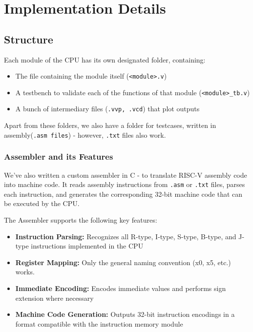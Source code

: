 \documentclass[journal]{IEEEtran}
\begin{document}
\section{Implementation Details}

\subsection{Structure}
Each module of the CPU has its own designated folder, containing:
\begin{itemize}
  \item The file containing the module itself (\texttt{<module>.v})
  \item A testbench to validate each of the functions of that module (\texttt{<module>\_tb.v})
  \item A bunch of intermediary files (\texttt{.vvp, .vcd}) that plot outputs
\end{itemize}

Apart from these folders, we also have a folder for testcases, written in
assembly(\texttt{.asm files}) - however, \texttt{.txt} files also work.

\subsubsection{Assembler and its Features}
We've also written a custom assembler in C - to translate RISC-V assembly code
into machine code. It reads assembly instructions from \texttt{.asm} or
\texttt{.txt} files, parses each instruction, and generates the corresponding
32-bit machine code that can be executed by the CPU.

The Assembler supports the following key features:

\begin{itemize}
  \item \textbf{Instruction Parsing:} Recognizes all R-type, I-type, S-type,
        B-type, and J-type instructions implemented in the CPU
  \item \textbf{Register Mapping:} Only the general naming convention (x0, x5,
        etc.) works.
  \item \textbf{Immediate Encoding:} Encodes immediate values and
        performs sign extension where necessary
  \item \textbf{Machine Code Generation:} Outputs 32-bit instruction encodings
        in a format compatible with the instruction memory module
\end{itemize}
\end{document}
